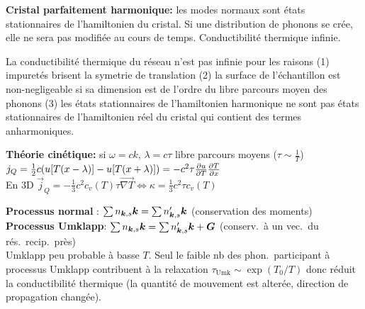 \begin{squishlist}
    \item \textbf{Cristal parfaitement harmonique:} les modes normaux sont états stationnaires de l'hamiltonien du cristal. Si une distribution de phonons se crée, elle ne sera pas modifiée au cours de temps. Conductibilité thermique infinie.
    \item La conductibilité thermique du réseau n'est pas infinie pour les raisons
    (1) impuretés brisent la symetrie de translation (2) la surface de l'échantillon est non-negligeable si sa dimension est de l'ordre du libre parcours moyen des phonons (3) les états stationnaires de l’hamiltonien harmonique ne sont pas états stationnaires de l’hamiltonien réel du cristal qui contient des termes anharmoniques.
    \item \textbf{Théorie cinétique:} si $\omega = ck$, $\lambda = c \tau$ libre parcours moyens ($\tau \sim \frac{1}{T}$) \\ $j_Q = \frac{1}{2}c (u[T(x-\lambda)] - u[T(x+\lambda)]) = - c^2 \tau \D{T}{u}\D{x}{T}$ \\
    En 3D $\vec{j}_Q = - \frac{1}{3}c^2 c_v(T) \tau \vec{\nabla T} \Longleftrightarrow \kappa = \frac{1}{3} c^2 \tau c_v(T)$
    \item \textbf{Processus normal} : $\sum n_{\vk,s}\vk = \sum n'_{\vk, s}\vk$ (conservation des moments) \\
    \textbf{Processus Umklapp}:  $\sum n_{\vk,s}\vk = \sum n'_{\vk, s}\vk + \vG$ (conserv.\ à un vec.\ du rés.\ recip.\ près) \\
    Umklapp peu probable à basse $T$. Seul le faible nb des phon.\ participant à  processus Umklapp contribuent à la relaxation $\tau_{\text{Umk}} \sim \exp(T_0/T)$ donc réduit la conductibilité thermique (la quantité de mouvement est alterée, direction de propagation changée).
\end{squishlist}

\columnbreak

